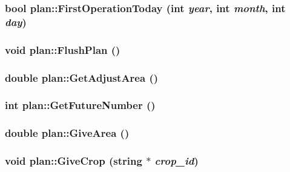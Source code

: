 \label{classplan_a336d1b751be876cf584e47d44826d8ac}
\hypertarget{classplan_aed8d97934d5b9ecb7a30ed937343d7b9}{
\subsubsection[{FirstOperationToday}]{\setlength{\rightskip}{0pt plus 5cm}bool plan::FirstOperationToday (int {\em year}, \/  int {\em month}, \/  int {\em day})}}
\label{classplan_aed8d97934d5b9ecb7a30ed937343d7b9}
\hypertarget{classplan_a0020926c3203f9d541b259a88b9fed9c}{
\subsubsection[{FlushPlan}]{\setlength{\rightskip}{0pt plus 5cm}void plan::FlushPlan ()}}
\label{classplan_a0020926c3203f9d541b259a88b9fed9c}
\hypertarget{classplan_aeac34b2dea2e779cf73477c0f9f263bb}{
\subsubsection[{GetAdjustArea}]{\setlength{\rightskip}{0pt plus 5cm}double plan::GetAdjustArea ()}}
\label{classplan_aeac34b2dea2e779cf73477c0f9f263bb}
\hypertarget{classplan_a8cd7e925bf86d2d2350a962b0392ae74}{
\subsubsection[{GetFutureNumber}]{\setlength{\rightskip}{0pt plus 5cm}int plan::GetFutureNumber ()}}
\label{classplan_a8cd7e925bf86d2d2350a962b0392ae74}
\hypertarget{classplan_a69ef07aba789edb9d649427e73dcc19c}{
\subsubsection[{GiveArea}]{\setlength{\rightskip}{0pt plus 5cm}double plan::GiveArea ()}}
\label{classplan_a69ef07aba789edb9d649427e73dcc19c}
\hypertarget{classplan_a46ca446bb7d23eff9d7f39d36b56d58b}{
\subsubsection[{GiveCrop}]{\setlength{\rightskip}{0pt plus 5cm}void plan::GiveCrop (string $\ast$ {\em crop\_\-id})}}
